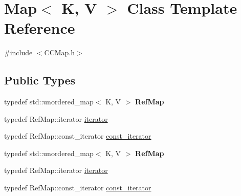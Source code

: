 \hypertarget{classMap}{}\section{Map$<$ K, V $>$ Class Template Reference}
\label{classMap}


{\ttfamily \#include $<$C\+C\+Map.\+h$>$}

\subsection*{Public Types}
\begin{DoxyCompactItemize}
\item 
\mbox{\label{classMap_a55c0f76505db9eb98f45a4e02f5f14d3}} 
typedef std\+::unordered\+\_\+map$<$ K, V $>$ {\bfseries Ref\+Map}
\item 
typedef Ref\+Map\+::iterator \hyperlink{classMap_ad1f372a2028b9f46497e873b0e984e84}{iterator}
\item 
typedef Ref\+Map\+::const\+\_\+iterator \hyperlink{classMap_add90fe1e25806ba6f6278b264e78ee9a}{const\+\_\+iterator}
\item 
\mbox{\label{classMap_a55c0f76505db9eb98f45a4e02f5f14d3}} 
typedef std\+::unordered\+\_\+map$<$ K, V $>$ {\bfseries Ref\+Map}
\item 
typedef Ref\+Map\+::iterator \hyperlink{classMap_ad1f372a2028b9f46497e873b0e984e84}{iterator}
\item 
typedef Ref\+Map\+::const\+\_\+iterator \hyperlink{classMap_add90fe1e25806ba6f6278b264e78ee9a}{const\+\_\+iterator}
\end{DoxyCompactItemize}
